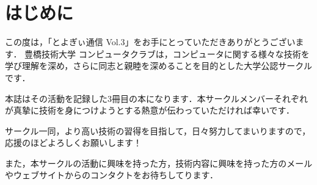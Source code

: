 \chapter{はじめに}
この度は，「とよぎぃ通信 Vol.3」をお手にとっていただきありがとうございます．
豊橋技術大学 コンピュータクラブは，コンピュータに関する様々な技術を学び理解を深め，さらに同志と親睦を深めることを目的とした大学公認サークルです．

本誌はその活動を記録した3冊目の本になります．本サークルメンバーそれぞれが真摯に技術を身につけようとする熱意が伝わっていただければ幸いです．

サークル一同，より高い技術の習得を目指して，日々努力してまいりますので，応援のほどよろしくお願いします！

また，本サークルの活動に興味を持った方，技術内容に興味を持った方のメールやウェブサイトからのコンタクトをお待ちしてります．
